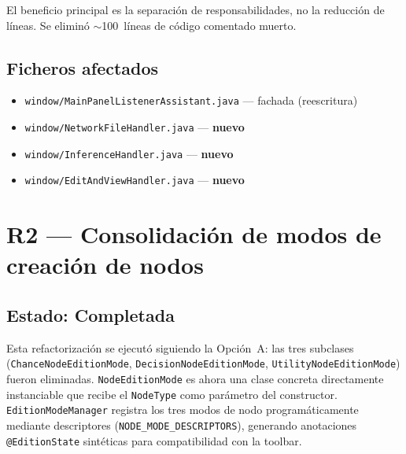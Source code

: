 \documentclass[12pt,a4paper]{article}
\newcommand{\code}[1]{\texttt{#1}}
\newcommand{\clase}[1]{\texttt{#1}}
\begin{document}
El beneficio principal es la separación de responsabilidades, no la
reducción de líneas. Se eliminó $\sim$100~líneas de código comentado
muerto.

\subsection{Ficheros afectados}

\begin{itemize}[nosep]
  \item \code{window/MainPanelListenerAssistant.java} --- fachada (reescritura)
  \item \code{window/NetworkFileHandler.java} --- \textbf{nuevo}
  \item \code{window/InferenceHandler.java} --- \textbf{nuevo}
  \item \code{window/EditAndViewHandler.java} --- \textbf{nuevo}
\end{itemize}

\section{R2 --- Consolidación de modos de creación de nodos}
\label{sec:r2}

\subsection{Estado: Completada}

Esta refactorización se ejecutó siguiendo la Opción~A: las tres
subclases (\clase{ChanceNodeEditionMode}, \clase{DecisionNodeEditionMode},
\clase{UtilityNodeEditionMode}) fueron eliminadas.
\clase{NodeEditionMode} es ahora una clase concreta directamente
instanciable que recibe el \code{NodeType} como parámetro del
constructor. \clase{EditionModeManager} registra los tres modos de
nodo programáticamente mediante descriptores
(\code{NODE\_MODE\_DESCRIPTORS}), generando anotaciones
\code{@EditionState} sintéticas para compatibilidad con la toolbar.

\end{document}
